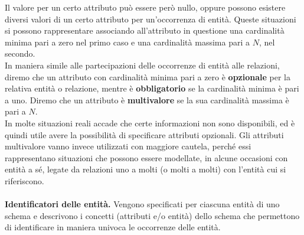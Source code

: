 Il valore per un certo attributo può essere però nullo, oppure possono esistere diversi valori di un certo attributo per un'occorrenza di entità. Queste situazioni si possono rappresentare associando all'attributo in questione una cardinalità minima pari a zero nel primo caso e una cardinalità massima pari a $N$, nel secondo.\\
In maniera simile alle partecipazioni delle occorrenze di entità alle relazioni, diremo che un attributo con cardinalità minima pari a zero è \textbf{opzionale} per la relativa entità o relazione, mentre è \textbf{obbligatorio} se la cardinalità minima è pari a uno. Diremo che un attributo è \textbf{multivalore} se la sua cardinalità massima è pari a $N$.\\
In molte situazioni reali accade che certe informazioni non sono disponibili, ed è quindi utile avere la possibilità di specificare attributi opzionali. Gli attributi multivalore vanno invece utilizzati con maggiore cautela, perché essi rappresentano situazioni che possono essere modellate, in alcune occasioni con entità a sé, legate da relazioni uno a molti (o molti a molti) con l'entità cui si riferiscono.\\\\ 
\textbf{Identificatori delle entità.} Vengono specificati per ciascuna entità di uno schema e descrivono i concetti (attributi e/o entità) dello schema che permettono di identificare in maniera univoca le occorrenze delle entità. 
